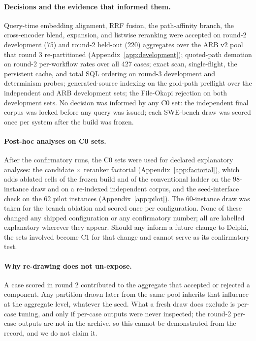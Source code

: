 \documentclass{article}
\newcommand{\system}{Delphi}
\begin{document}
\begin{table}[h]
\centering
\caption{Case-level exposure ledger. Every case ID of every set is listed in the machine-readable ledger in the archive with the evidence for its class.}
\label{tab:ledger}
\footnotesize

\end{table}

\paragraph{Decisions and the evidence that informed them.} Query-time embedding alignment, RRF fusion, the path-affinity branch, the cross-encoder blend, expansion, and listwise reranking were accepted on round-2 development (75) and round-2 held-out (220) aggregates over the ARB v2 pool that round 3 re-partitioned (Appendix~\ref{app:development}); quoted-path demotion on round-2 per-workflow rates over all 427 cases; exact scan, single-flight, the persistent cache, and total SQL ordering on round-3 development and determinism probes; generated-source indexing on the gold-path preflight over the independent and ARB development sets; the File-Okapi rejection on both development sets. No decision was informed by any C0 set: the independent final corpus was locked before any query was issued; each SWE-bench draw was scored once per system after the build was frozen.

\paragraph{Post-hoc analyses on C0 sets.} After the confirmatory runs, the C0 sets were used for declared explanatory analyses: the candidate $\times$ reranker factorial (Appendix~\ref{app:factorial}), which adds ablated cells of the frozen build and of the conventional ladder on the 98-instance draw and on a re-indexed independent corpus, and the seed-interface check on the 62 pilot instances (Appendix~\ref{app:pilot}). The 60-instance draw was taken for the branch ablation and scored once per configuration. None of these changed any shipped configuration or any confirmatory number; all are labelled explanatory wherever they appear. Should any inform a future change to \system{}, the sets involved become C1 for that change and cannot serve as its confirmatory test.

\paragraph{Why re-drawing does not un-expose.} A case scored in round 2 contributed to the aggregate that accepted or rejected a component. Any partition drawn later from the same pool inherits that influence at the aggregate level, whatever the seed. What a fresh draw does exclude is per-case tuning, and only if per-case outputs were never inspected; the round-2 per-case outputs are not in the archive, so this cannot be demonstrated from the record, and we do not claim it.
\end{document}
